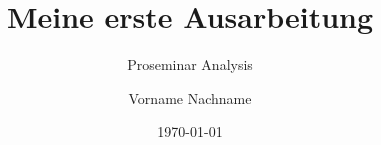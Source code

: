 \usepackage{iftex}				%
\ifPDFTeX						%
	\usepackage[T1]{fontenc}	%
	\usepackage{lmodern}		%
\fi
\usepackage{babel}				%
\usepackage{csquotes}			%

\usepackage{amsmath}			%
\usepackage{amssymb}			%
\usepackage{amsthm}				%

\usepackage{graphicx}			%

\usepackage[style=numeric, backend=biber]{biblatex}

\usepackage[hidelinks]{hyperref}

\theoremstyle{plain}				%
\newtheorem{satz}{Satz}[section]	%
\newtheorem{lemma}[satz]{Lemma}		%
\theoremstyle{definition}			%
\newtheorem{definition}[satz]{Definition}
\newtheorem{beispiel}[satz]{Beispiel}

\newcommand{\R}{\mathbb{R}}		%
\newcommand{\N}{\mathbb{N}}		%

\title{Meine erste Ausarbeitung}
\subtitle{Proseminar Analysis}
\author{Vorname Nachname}
\date{\today}					%



\maketitle			%
\tableofcontents	%

